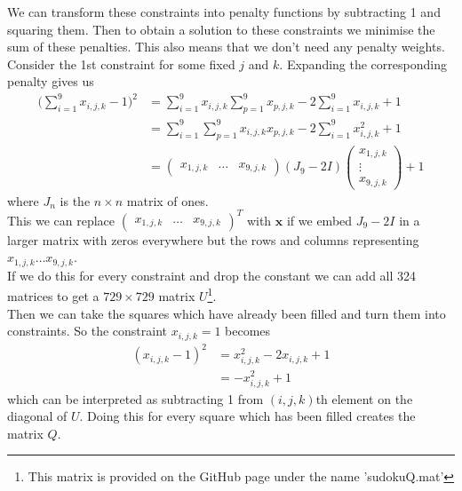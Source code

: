 \documentclass{article}
\begin{document}
\noindent We can transform these constraints into penalty functions by subtracting 1 and squaring them. Then to obtain a solution to these constraints we minimise the sum of these penalties. This also means that we don't need any penalty weights.\\

\noindent Consider the 1st constraint for some fixed \(j\) and \(k\). Expanding the corresponding penalty gives us
\begin{align*}
    \bigg(\sum_{i=1}^9 x_{i,j,k} - 1\bigg)^2 &= \sum_{i=1}^9 x_{i,j,k}\sum_{p=1}^9 x_{p,j,k} -2\sum_{i=1}^9 x_{i,j,k} + 1  \\
    &= \sum_{i=1}^9\sum_{p=1}^9 x_{i,j,k}x_{p,j,k} -2\sum_{i=1}^9 x_{i,j,k}^2 + 1 \\
    &= \begin{pmatrix}
        x_{1,j,k} & \dots & x_{9,j,k}
    \end{pmatrix} (J_9 - 2I) \begin{pmatrix}
        x_{1,j,k} \\
        \vdots \\
        x_{9,j,k}
    \end{pmatrix} + 1
\end{align*}
where \(J_n\) is the \(n \times n\) matrix of ones. \\

\noindent This we can replace \(\begin{pmatrix}
        x_{1,j,k} & \dots & x_{9,j,k}
    \end{pmatrix}^T\) with \(\mathbf{x}\) if we
    embed \(J_9 - 2I\) in a larger matrix with zeros everywhere but the rows and columns representing \(x_{1,j,k} \dots x_{9,j,k}\).\\

\noindent If we do this for every constraint and drop the constant we can add all 324 matrices to get a \(729 \times 729\) matrix \(U\)\footnote{This matrix is provided on the GitHub page under the name 'sudokuQ.mat' }.\\

\noindent Then we can take the squares which have already been filled and turn them into constraints. So the constraint \(x_{i,j,k} = 1\) becomes 
\begin{align*}
    (x_{i,j,k} - 1)^2 &= x_{i,j,k}^2 - 2x_{i,j,k} + 1 \\
    &= -x_{i,j,k}^2 + 1
\end{align*}
which can be interpreted as subtracting 1 from \((i,j,k)\)th element on the diagonal of \(U\). Doing this for every square which has been filled creates the matrix \(Q\).\\
\end{document}
